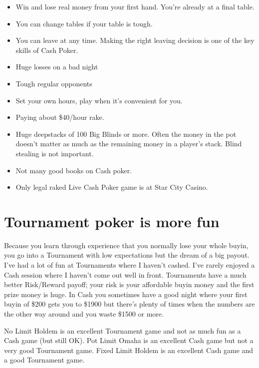 \begin{itemize}
  \item Win and lose real money from your first hand. You're already
    at a final table.
  \item You can change tables if your table is tough.
  \item You can leave at any time. Making the right leaving decision
    is one of the key skills of Cash Poker.
  \item Huge losses on a bad night
  \item Tough regular opponents
  \item Set your own hours, play when it's convenient for you.
  \item Paying about \$40/hour rake.
  \item Huge deepstacks of 100 Big Blinds or more. Often the money in
    the pot doesn't matter as much as the remaining money in a
    player's stack. Blind stealing is not important.
  \item Not many good books on Cash poker.
  \item Only legal raked Live Cash Poker game is at Star City Casino.
\end{itemize}

\section{Tournament poker is more fun}

Because you learn through experience that you normally lose your whole
buyin, you go into a Tournament with low expectations but the dream of
a big payout. I've had a lot of fun at Tournaments where I haven't
cashed. I've rarely enjoyed a Cash session where I haven't come out
well in front. Tournaments have a much better Risk/Reward payoff; your
risk is your affordable buyin money and the first prize money is
huge. In Cash you sometimes have a good night where your first buyin
of \$200 gets you to \$1900 but there's plenty of times when the
numbers are the other way around and you waste \$1500 or more.

No Limit Holdem is an excellent Tournament game and not as much fun as
a Cash game (but still OK). Pot Limit Omaha is an excellent Cash game
but not a very good Tournament game. Fixed Limit Holdem is an
excellent Cash game and a good Tournament game.
